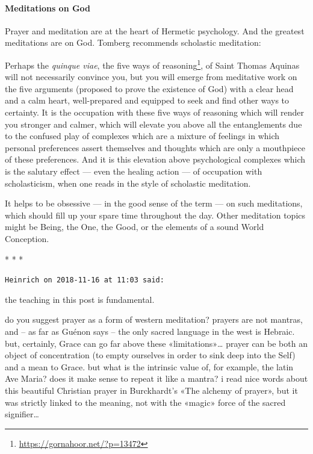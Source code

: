 \paragraph{Meditations on God}
Prayer and meditation are at the heart of Hermetic psychology. And the greatest meditations are on God. Tomberg recommends scholastic meditation:

\begin{quotex}
Perhaps the \emph{quinque viae}, the five ways of reasoning\footnote{\url{https://gornahoor.net/?p=13472}}, of Saint Thomas Aquinas will not necessarily convince you, but you will emerge from meditative work on the five arguments (proposed to prove the existence of God) with a clear head and a calm heart, well-prepared and equipped to seek and find other ways to certainty. It is the occupation with these five ways of reasoning which will render you stronger and calmer, which will elevate you above all the entanglements due to the confused play of complexes which are a mixture of feelings in which personal preferences assert themselves and thoughts which are only a mouthpiece of these preferences. And it is this elevation above psychological complexes which is the salutary effect — even the healing action — of occupation with scholasticism, when one reads in the style of scholastic meditation. 

\end{quotex}
It helps to be obsessive — in the good sense of the term — on such meditations, which should fill up your spare time throughout the day. Other meditation topics might be Being, the One, the Good, or the elements of a sound World Conception.




\begin{center}* * *\end{center}

\begin{footnotesize}\begin{sffamily}



\texttt{Heinrich on 2018-11-16 at 11:03 said: }

the teaching in this post is fundamental.

do you suggest prayer as a form of western meditation? prayers are not mantras, and – as far as Guénon says – the only sacred language in the west is Hebraic. but, certainly, Grace can go far above these «limitations»… prayer can be both an object of concentration (to empty ourselves in order to sink deep into the Self) and a mean to Grace. but what is the intrinsic value of, for example, the latin Ave Maria? does it make sense to repeat it like a mantra? i read nice words about this beautiful Christian prayer in Burckhardt's «The alchemy of prayer», but it was strictly linked to the meaning, not with the «magic» force of the sacred signifier…


\end{sffamily}\end{footnotesize}
